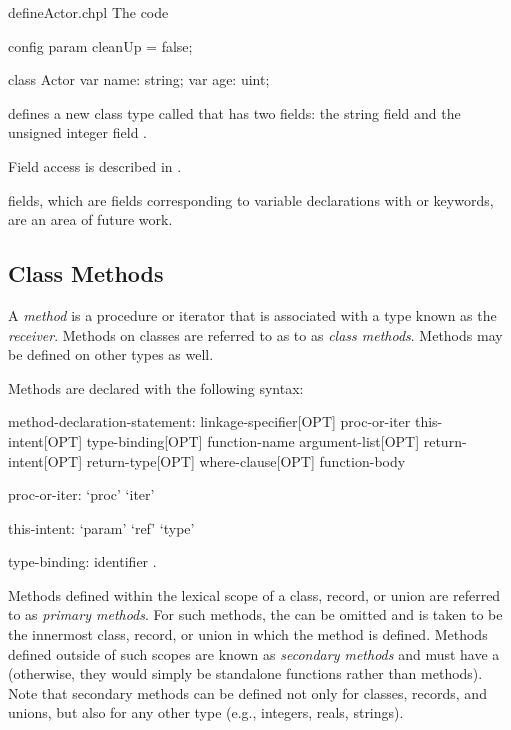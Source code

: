 \begin{chapelexample}{defineActor.chpl}
The code
\begin{chapelpre}
config param cleanUp = false;
\end{chapelpre}
\begin{chapel}
class Actor {
  var name: string;
  var age: uint;
}
\end{chapel}
\begin{chapeloutput}
\end{chapeloutput}
defines a new class type called  that has two fields: the
string field  and the unsigned integer field .
\end{chapelexample}

Field access is described in .

\begin{future}
 fields, which are fields corresponding to variable declarations
with  or  keywords, are an area of future work.
\end{future}

\subsection{Class Methods}
\label{Class_Methods}

A \emph{method} is a procedure or iterator that is associated with a
type known as the \emph{receiver}.  Methods on classes are referred
to as to as \emph{class methods}.  Methods may be defined on other
types as well.

Methods are declared with the following syntax:
\begin{syntax}
method-declaration-statement:
  linkage-specifier[OPT] proc-or-iter this-intent[OPT] type-binding[OPT] function-name argument-list[OPT] 
    return-intent[OPT] return-type[OPT] where-clause[OPT] function-body

proc-or-iter:
  `proc'
  `iter'

this-intent:
  `param'
  `ref'
  `type'

type-binding:
  identifier .
\end{syntax}
Methods defined within the lexical scope of a class, record, or union
are referred to as \emph{primary methods}.  For such methods,
the  can be omitted and is taken to be the
innermost class, record, or union in which the method is defined.
Methods defined outside of such scopes are known as \emph{secondary
methods} and must have a  (otherwise, they would
simply be standalone functions rather than methods).  Note that
secondary methods can be defined not only for classes, records, and
unions, but also for any other type (e.g., integers, reals, strings).


